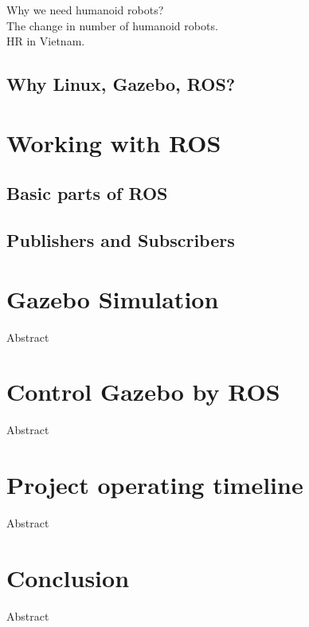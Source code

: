 \documentclass[pdftex,12pt,a4paper]{article}
\begin{document}
  Why we need humanoid robots? \\
  The change in number of humanoid robots. \\
  HR in Vietnam. \\
  \subsection{Why Linux, Gazebo, ROS?}
  
  \newpage
  \section{Working with ROS}
  \subsection{Basic parts of ROS}
  
  \newpage
  \subsection{Publishers and Subscribers}
  
  \newpage
  \section{Gazebo Simulation}
  Abstract
  
  \newpage
  \section{Control Gazebo by ROS}
  Abstract

  \newpage
  \section{Project operating timeline}
  Abstract
  
  \newpage
  \section{Conclusion}
  Abstract
  
  \newpage
\end{document}
